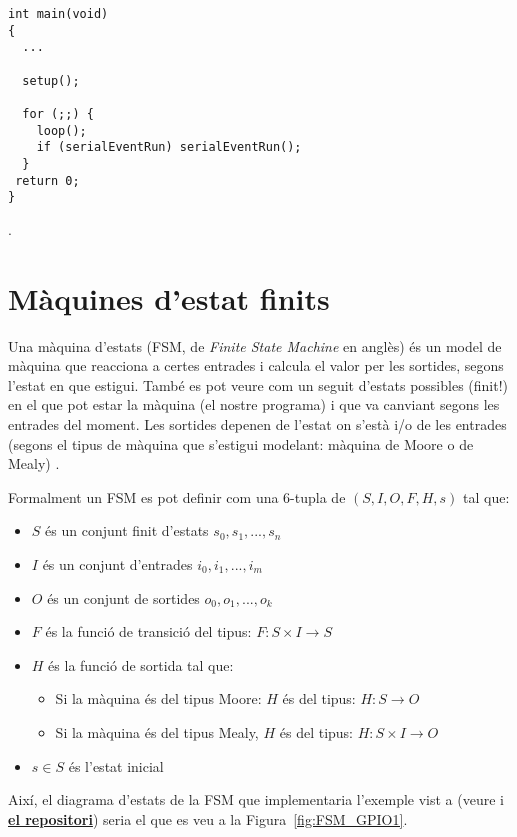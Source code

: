 \begin{lstlisting}[style=customc, label=arduinomain, caption=funció main() d'Arduino]
 int main(void)
{
  ...

  setup();

  for (;;) {
    loop();
    if (serialEventRun) serialEventRun();
  }
 return 0;
} 
\end{lstlisting}


.

\section{Màquines d'estat finits}
\label{sec:FSM}

Una màquina d'estats (\gls{FSM}, de {\em Finite State Machine} en anglès) és un model de màquina que reacciona a certes entrades i calcula el valor per les sortides, segons l'estat en que estigui. També es pot veure com un seguit d'estats possibles (finit!) en el que pot estar la màquina (el nostre programa) i que va canviant segons les entrades del moment. Les sortides depenen de l'estat on s'està i/o de les entrades (segons el tipus de màquina que s'estigui modelant: màquina de Moore o de Mealy) \cite{wiki:FSM}.

\begin{remark}
 Formalment un FSM es pot definir com una 6-tupla de $(S, I, O, F, H, s)$ tal que:
\begin{itemize}
 \item $S$ és un conjunt finit d'estats ${s_0,s_1, ..., s_n}$
 \item $I$ és un conjunt d'entrades ${i_0, i_1, ..., i_m}$
 \item $O$ és un conjunt de sortides ${o_0, o_1, ..., o_k}$
 \item $F$ és la funció de transició del tipus: $F: S \times I \to S$
 \item $H$ és la funció de sortida tal que:
 \begin{itemize}
  \item Si la màquina és del tipus Moore: $H$ és del tipus: $H: S \to O$
  \item Si la màquina és del tipus Mealy, $H$ és del tipus: $H: S \times I \to O$ 
 \end{itemize}
 \item $s \in S$ és l'estat inicial 
\end{itemize}
\end{remark}

Així, el diagrama d'estats de la FSM que implementaria l'exemple vist a (veure  i \href{https://github.com/mariusmm/cursembedded/tree/master/Simplicity/GPIO_1}{\bf el repositori}) seria el que es veu a la Figura~\ref{fig:FSM_GPIO1}.

